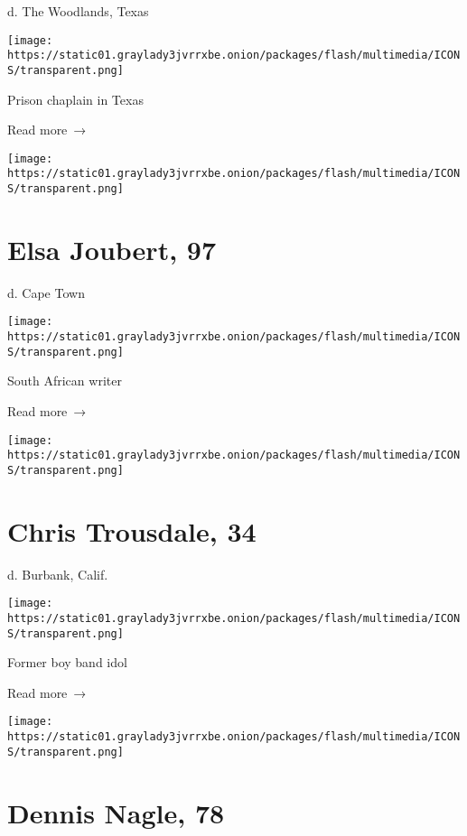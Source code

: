 d. The Woodlands, Texas

\texttt{[image: https://static01.graylady3jvrrxbe.onion/packages/flash/multimedia/ICONS/transparent.png]}

Prison chaplain in Texas

 Read more~→

\href{https://www.nytimes3xbfgragh.onion/2020/06/25/books/elsa-joubert-dead-coronavirus.html}{}

\texttt{[image: https://static01.graylady3jvrrxbe.onion/packages/flash/multimedia/ICONS/transparent.png]}

\hypertarget{elsa-joubert-97}{%
\section{Elsa Joubert, 97}\label{elsa-joubert-97}}

d. Cape Town

\texttt{[image: https://static01.graylady3jvrrxbe.onion/packages/flash/multimedia/ICONS/transparent.png]}

South African writer

 Read more~→

\href{https://www.nytimes3xbfgragh.onion/2020/06/25/obituaries/chris-trousdale-dead-coronavirus.html}{}

\texttt{[image: https://static01.graylady3jvrrxbe.onion/packages/flash/multimedia/ICONS/transparent.png]}

\hypertarget{chris-trousdale-34}{%
\section{Chris Trousdale, 34}\label{chris-trousdale-34}}

d. Burbank, Calif.

\texttt{[image: https://static01.graylady3jvrrxbe.onion/packages/flash/multimedia/ICONS/transparent.png]}

Former boy band idol

 Read more~→

\href{https://www.nytimes3xbfgragh.onion/2020/06/25/science/dennis-nagle-dead-coronavirus.html}{}

\texttt{[image: https://static01.graylady3jvrrxbe.onion/packages/flash/multimedia/ICONS/transparent.png]}

\hypertarget{dennis-nagle-78}{%
\section{Dennis Nagle, 78}\label{dennis-nagle-78}}

